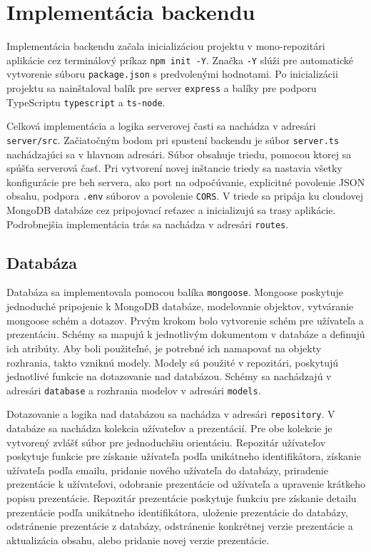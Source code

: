 \section{Implementácia backendu}
\label{impbackend}
Implementácia backendu začala inicializáciou projektu v mono-repozitári aplikácie cez terminálový príkaz \texttt{npm init -Y}. Značka \texttt{-Y} slúži pre automatické vytvorenie súboru \texttt{package.json} s predvolenými hodnotami. Po inicializácii projektu sa nainštaloval balík pre server \texttt{express} a balíky pre podporu TypeScriptu \texttt{typescript} a \texttt{ts-node}.

Celková implementácia a logika serverovej časti sa nachádza v adresári \texttt{server/src}. Začiatočným bodom pri spustení backendu je súbor \texttt{server.ts} nachádzajúci sa v hlavnom adresári. Súbor obsahuje triedu, pomocou ktorej sa spúšťa serverová časť. Pri vytvorení novej inštancie triedy sa nastavia všetky konfigurácie pre beh servera, ako port na odpočúvanie, explicitné povolenie JSON obsahu, podpora \texttt{.env} súborov a povolenie \texttt{CORS}. V triede sa pripája ku cloudovej MongoDB databáze cez pripojovací reťazec a inicializujú sa trasy aplikácie. Podrobnejšia implementácia trás sa nachádza v adresári \texttt{routes}. 

\subsection{Databáza}
Databáza sa implementovala pomocou balíka \texttt{mongoose}. Mongoose poskytuje jednoduché pripojenie k MongoDB databáze, modelovanie objektov, vytváranie mongoose schém a dotazov. Prvým krokom bolo vytvorenie schém pre užívateľa a prezentáciu. Schémy sa mapujú k jednotlivým dokumentom v databáze a definujú ich atribúty. Aby boli použiteľné, je potrebné ich namapovať na objekty rozhrania, takto vzniknú modely. Modely sú použité v repozitári, poskytujú jednotlivé funkcie na dotazovanie nad databázou. Schémy sa nachádzajú v adresári \texttt{database} a rozhrania modelov v adresári \texttt{models}.

Dotazovanie a logika nad databázou sa nachádza v adresári \texttt{repository}. V databáze sa nachádza kolekcia užívateľov a prezentácií. Pre obe kolekcie je vytvorený zvlášť súbor pre jednoduchšiu orientáciu. Repozitár užívateľov poskytuje funkcie pre získanie užívateľa podľa unikátneho identifikátora, získanie užívateľa podľa emailu, pridanie nového užívateľa do databázy, priradenie prezentácie k užívateľovi, odobranie prezentácie od užívateľa a upravenie krátkeho popisu prezentácie. Repozitár prezentácie poskytuje funkciu pre získanie detailu prezentácie podľa unikátneho identifikátora, uloženie prezentácie do databázy, odstránenie prezentácie z databázy, odstránenie konkrétnej verzie prezentácie a aktualizácia obsahu, alebo pridanie novej verzie prezentácie.

